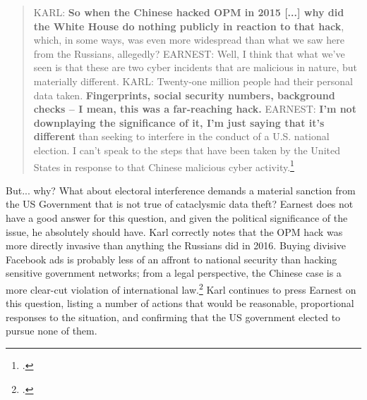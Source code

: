 \documentclass{memoir}
\begin{document}
\begin{refsegment}
\begin{quote}
KARL: \textbf{So when the Chinese hacked OPM in 2015 [...] why did the White House do nothing publicly in reaction to that hack}, which, in some ways, was even more widespread than what we saw here from the Russians, allegedly?
\newline \newline
EARNEST: Well, I think that what we've seen is that these are two cyber incidents that are malicious in nature, but materially different.
\newline \newline
KARL: Twenty-one million people had their personal data taken.  \textbf{Fingerprints, social security numbers, background checks -- I mean, this was a far-reaching hack.}
\newline \newline
EARNEST: \textbf{I'm not downplaying the significance of it, I'm just saying that it's different} than seeking to interfere in the conduct of a U.S. national election. I can't speak to the steps that have been taken by the United States in response to that Chinese malicious cyber activity.\footcite[Transcript adapted from the official White House website.]{earnest_press_2017}
\end{quote}
But... why? What about electoral interference demands a material sanction from the US Government that is not true of cataclysmic data theft? Earnest does not have a good answer for this question, and given the political significance of the issue, he absolutely should have. Karl correctly notes that the OPM hack was more directly invasive than anything the Russians did in 2016. Buying divisive Facebook ads is probably less of an affront to national security than hacking sensitive government networks; from a legal perspective, the Chinese case is a more clear-cut violation of international law.\footcite[p.~625]{terry_dont_2018} Karl continues to press Earnest on this question, listing a number of actions that would be reasonable, proportional responses to the situation, and confirming that the US government elected to pursue none of them.


\end{refsegment}
\end{document}
